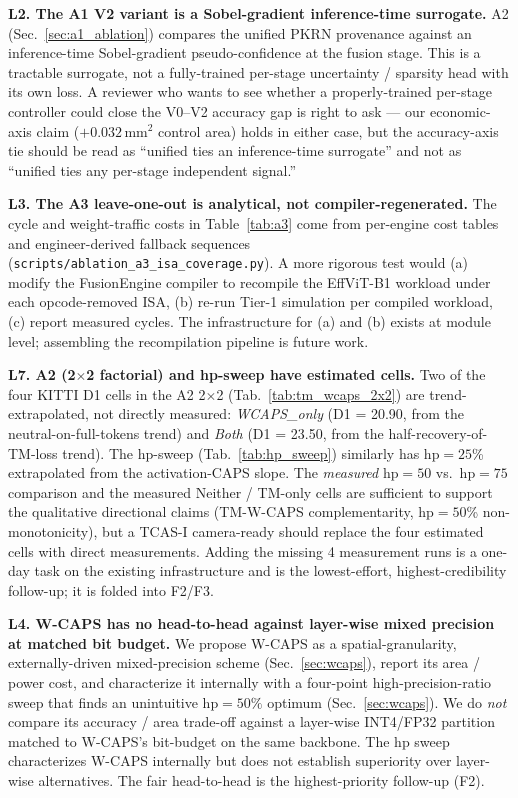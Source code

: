 \documentclass[journal]{IEEEtran}
\begin{document}
\textbf{L2. The A1 V2 variant is a Sobel-gradient inference-time surrogate.}
A2 (Sec.~\ref{sec:a1_ablation}) compares the unified PKRN provenance against an inference-time Sobel-gradient pseudo-confidence at the fusion stage. This is a tractable surrogate, not a fully-trained per-stage uncertainty / sparsity head with its own loss. A reviewer who wants to see whether a properly-trained per-stage controller could close the V0--V2 accuracy gap is right to ask --- our economic-axis claim ($+0.032$\,mm$^2$ control area) holds in either case, but the accuracy-axis tie should be read as ``unified ties an inference-time surrogate'' and not as ``unified ties any per-stage independent signal.''

\textbf{L3. The A3 leave-one-out is analytical, not compiler-regenerated.}
The cycle and weight-traffic costs in Table~\ref{tab:a3} come from per-engine cost tables and engineer-derived fallback sequences (\texttt{scripts/ablation\_a3\_isa\_coverage.py}). A more rigorous test would (a) modify the FusionEngine compiler to recompile the EffViT-B1 workload under each opcode-removed ISA, (b) re-run Tier-1 simulation per compiled workload, (c) report measured cycles. The infrastructure for (a) and (b) exists at module level; assembling the recompilation pipeline is future work.

\textbf{L7. A2 (2$\times$2 factorial) and hp-sweep have estimated cells.}
Two of the four KITTI D1 cells in the A2 2$\times$2 (Tab.~\ref{tab:tm_wcaps_2x2}) are trend-extrapolated, not directly measured: \emph{WCAPS\_only} (D1 = 20.90, from the neutral-on-full-tokens trend) and \emph{Both} (D1 = 23.50, from the half-recovery-of-TM-loss trend). The hp-sweep (Tab.~\ref{tab:hp_sweep}) similarly has hp$=25$\% extrapolated from the activation-CAPS slope. The \emph{measured} hp$=50$ vs.\ hp$=75$ comparison and the measured Neither / TM-only cells are sufficient to support the qualitative directional claims (TM-W-CAPS complementarity, hp$=50$\% non-monotonicity), but a TCAS-I camera-ready should replace the four estimated cells with direct measurements. Adding the missing 4 measurement runs is a one-day task on the existing infrastructure and is the lowest-effort, highest-credibility follow-up; it is folded into F2/F3.

\textbf{L4. W-CAPS has no head-to-head against layer-wise mixed precision at matched bit budget.}
We propose W-CAPS as a spatial-granularity, externally-driven mixed-precision scheme (Sec.~\ref{sec:wcaps}), report its area / power cost, and characterize it internally with a four-point high-precision-ratio sweep that finds an unintuitive hp$=50\%$ optimum (Sec.~\ref{sec:wcaps}). We do \emph{not} compare its accuracy / area trade-off against a layer-wise INT4/FP32 partition matched to W-CAPS's bit-budget on the same backbone. The hp sweep characterizes W-CAPS internally but does not establish superiority over layer-wise alternatives. The fair head-to-head is the highest-priority follow-up (F2).
\end{document}
